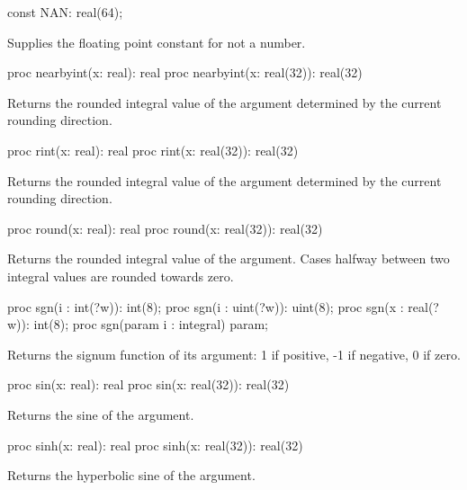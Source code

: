 \begin{protohead}
const NAN: real(64);
\end{protohead}
\begin{protobody}
Supplies the floating point constant for not a number.
\end{protobody}

\begin{protohead}
proc nearbyint(x: real): real
proc nearbyint(x: real(32)): real(32)
\end{protohead}
\begin{protobody}
Returns the rounded integral value of the argument determined by the
current rounding direction.
\end{protobody}

\begin{protohead}
proc rint(x: real): real
proc rint(x: real(32)): real(32)
\end{protohead}
\begin{protobody}
Returns the rounded integral value of the argument determined by the
current rounding direction.
\end{protobody}

\begin{protohead}
proc round(x: real): real
proc round(x: real(32)): real(32)
\end{protohead}
\begin{protobody}
Returns the rounded integral value of the argument.  Cases halfway
between two integral values are rounded towards zero.
\end{protobody}

\begin{protohead}
proc sgn(i : int(?w)):   int(8);
proc sgn(i : uint(?w)): uint(8);
proc sgn(x : real(?w)):  int(8);
proc sgn(param i : integral) param;
\end{protohead}
\begin{protobody}
Returns the signum function of its argument:
1 if positive, -1 if negative, 0 if zero.
\end{protobody}

\begin{protohead}
proc sin(x: real): real
proc sin(x: real(32)): real(32)
\end{protohead}
\begin{protobody}
Returns the sine of the argument.
\end{protobody}

\begin{protohead}
proc sinh(x: real): real
proc sinh(x: real(32)): real(32)
\end{protohead}
\begin{protobody}
Returns the hyperbolic sine of the argument.
\end{protobody}


